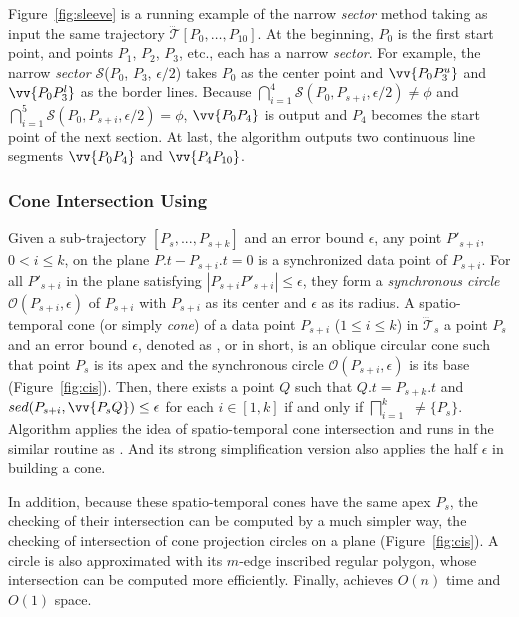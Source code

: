 \begin{example}
	\label{exm-alg-sleeve}
	Figure~\ref{fig:sleeve} is a running example of the narrow \emph{sector} method taking as input the same trajectory $\dddot{\mathcal{T}}[P_0, \ldots, P_{10}]$. At the beginning, $P_0$ is the first start point, and points $P_1$, $P_2$, $P_3$, etc., each has a narrow \emph{sector}.
	For example, the narrow \emph{sector} $\mathcal{S}$($P_0$, $P_{3}$, $\epsilon/2$) takes $P_0$ as the center point and $\vv{P_0P^u_{3}}$ and $\vv{P_0P^l_{3}}$ as the border lines.
	Because $\bigcap_{i=1}^{4}\mathcal{S}(P_0, P_{s+i}, \epsilon/2) \ne \phi$ and $\bigcap_{i=1}^{5}\mathcal{S}(P_0, P_{s+i}, \epsilon/2) = \phi$, $\vv{P_0P_4}$ is output and $P_4$ becomes the start point of the next section.
	At last, the algorithm outputs two continuous line segments $\vv{P_0P_4}$ and $\vv{P_4P_{10}}$.
\end{example}




\subsubsection {Cone Intersection Using \sed}
\label{sec-cised}

Given a sub-trajectory $[P_s,...,P_{s+k}]$ and an error bound $\epsilon$, any point $P'_{s+i}$, $0< i \le k$, on the plane $P.t-P_{s+i}.t = 0$ is a synchronized data point of $P_{s+i}$. For all $P'_{s+i}$ in the plane satisfying $|P_{s+i}P'_{s+i}| \le \epsilon$, they form a \textit{synchronous circle $\mathcal{O}(P_{s+i}, \epsilon)$} of $P_{s+i}$ with $P_{s+i}$ as its center and $\epsilon$ as its radius.
%
A spatio-temporal cone (or simply \textit{cone}) of a data point $P_{s+i}$ ($1\le i\le k$) in $\dddot{\mathcal{T}}_s$ \wrt a point $P_s$ and an error bound $\epsilon$, denoted as , or  in short, is an oblique circular cone such that point $P_s$ is its apex and the synchronous circle $\mathcal{O}(P_{s+i}, \epsilon)$ is its base (Figure~\ref{fig:cis}).
%
Then, there exists a point $Q$ such that $Q.t = P_{s+k}.t$ and $sed(P_{s+i}, \vv{P_sQ})\le \epsilon$ for each $i \in [1,k]$ if and only if $\bigsqcap_{i=1}^{k}$ $\ne \{P_s\}$.
%
Algorithm \cised applies the idea of spatio-temporal cone intersection and runs in the similar routine as \siped. And its strong simplification version also applies the half $\epsilon$ in building a cone.

In addition, because these spatio-temporal cones have the same apex $P_s$, the checking of their intersection can be computed by a much simpler way, \ie the checking of intersection of cone projection circles on a plane (Figure~\ref{fig:cis}). A circle is also approximated with its $m$-edge inscribed regular polygon, whose intersection can be computed more efficiently.
Finally, \cised achieves $O(n)$ time and $O(1)$ space. 

